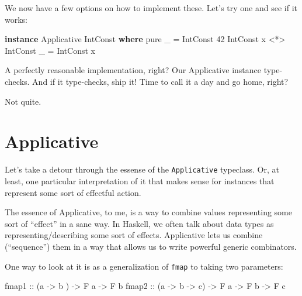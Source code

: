 \documentclass[]{article}
\newenvironment{Shaded}{}{}
\newcommand{\DataTypeTok}[1]{\textcolor[rgb]{0.56,0.13,0.00}{#1}}
\newcommand{\DecValTok}[1]{\textcolor[rgb]{0.25,0.63,0.44}{#1}}
\newcommand{\FunctionTok}[1]{\textcolor[rgb]{0.02,0.16,0.49}{#1}}
\newcommand{\KeywordTok}[1]{\textcolor[rgb]{0.00,0.44,0.13}{\textbf{#1}}}
\newcommand{\NormalTok}[1]{#1}
\newcommand{\OtherTok}[1]{\textcolor[rgb]{0.00,0.44,0.13}{#1}}
\begin{document}
We now have a few options on how to implement these. Let's try one and see if it
works:

\begin{Shaded}
\begin{Highlighting}[]
\KeywordTok{instance} \DataTypeTok{Applicative} \DataTypeTok{IntConst} \KeywordTok{where}
\NormalTok{    pure _ }\FunctionTok{=} \DataTypeTok{IntConst} \DecValTok{42}
    \DataTypeTok{IntConst}\NormalTok{ x }\FunctionTok{<*>} \DataTypeTok{IntConst}\NormalTok{ _ }\FunctionTok{=} \DataTypeTok{IntConst}\NormalTok{ x}
\end{Highlighting}
\end{Shaded}

A perfectly reasonable implementation, right? Our Applicative instance
type-checks. And if it type-checks, ship it! Time to call it a day and go home,
right?

Not quite.

\hypertarget{applicative}{%
\section{Applicative}\label{applicative}}

Let's take a detour through the essense of the \texttt{Applicative} typeclass.
Or, at least, one particular interpretation of it that makes sense for instances
that represent some sort of effectful action.

The essence of Applicative, to me, is a way to combine values representing some
sort of ``effect'' in a sane way. In Haskell, we often talk about data types as
representing/describing some sort of effects. Applicative lets us combine
(``sequence'') them in a way that allows us to write powerful generic
combinators.

One way to look at it is as a generalization of \texttt{fmap} to taking two
parameters:

\begin{Shaded}
\begin{Highlighting}[]
\OtherTok{fmap1 ::}\NormalTok{ (a }\OtherTok{->}\NormalTok{ b     ) }\OtherTok{->} \DataTypeTok{F}\NormalTok{ a }\OtherTok{->} \DataTypeTok{F}\NormalTok{ b}
\OtherTok{fmap2 ::}\NormalTok{ (a }\OtherTok{->}\NormalTok{ b }\OtherTok{->}\NormalTok{ c) }\OtherTok{->} \DataTypeTok{F}\NormalTok{ a }\OtherTok{->} \DataTypeTok{F}\NormalTok{ b }\OtherTok{->} \DataTypeTok{F}\NormalTok{ c}
\end{Highlighting}
\end{Shaded}
\end{document}
